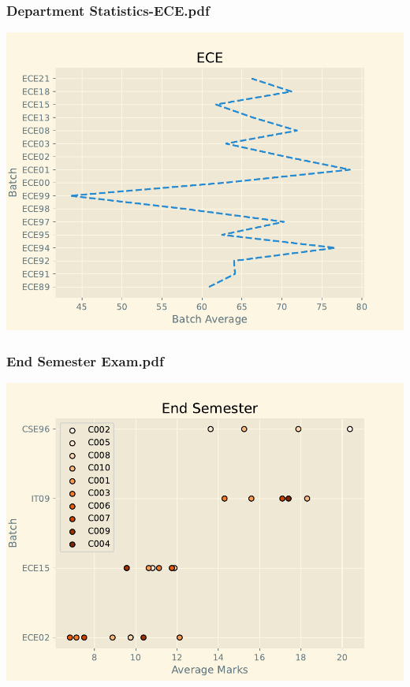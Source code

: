 \documentclass{article}
\begin{document}
\begin{center}
		\subsubsection*{Department Statistics-ECE.pdf}
		\includegraphics{outputs/Department Statistics-ECE.pdf}
		\subsubsection*{End Semester Exam.pdf}
		\includegraphics{outputs/End Semester Exam.pdf}
	\end{center}
\end{document}
